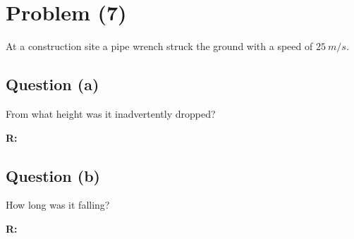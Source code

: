 \section{Problem (7)}
	At a construction site a pipe wrench struck the ground with a speed of $25 \ m/s$.

	\subsection{Question (a)}
		From what height was it inadvertently dropped?

		\textbf{R:} \newline

	\subsection{Question (b)}
		How long was it falling?

		\textbf{R:} \newline
